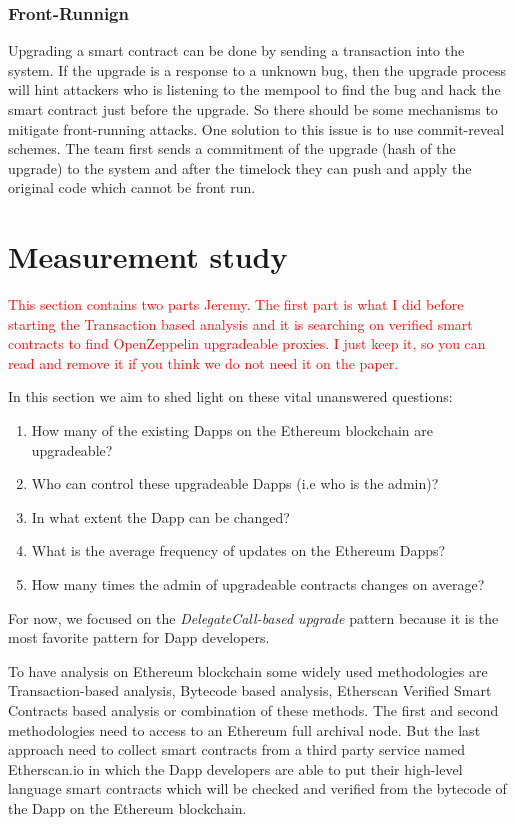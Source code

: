 \subsubsection{Front-Runnign}
Upgrading a smart contract can be done by sending a transaction into the system. If the upgrade is a response to a unknown bug, then the upgrade process will hint attackers who is listening to the mempool to find the bug and hack the smart contract just before the upgrade. So there should be some mechanisms to mitigate front-running attacks. One solution to this issue is to use commit-reveal schemes. The team first sends a commitment of the upgrade (hash of the upgrade) to the system and after the timelock they can push and apply the original code which cannot be front run. 





 \section{Measurement study}
 \textcolor{red}{This section contains two parts Jeremy. The first part is what I did before starting the Transaction based analysis and it is searching on verified smart contracts to find OpenZeppelin upgradeable proxies. I just keep it, so you can read and remove it if you think we do not need it on the paper.}

 In this section we aim to shed light on these vital unanswered questions: 
 \begin{enumerate}
  \item How many of the existing Dapps on the Ethereum blockchain are upgradeable?
  \item Who can control these upgradeable Dapps (i.e who is the admin)? 
  \item In what extent the Dapp can be changed?
  \item What is the average frequency of updates on the Ethereum Dapps?
  \item How many times the admin of upgradeable contracts changes on average?
\end{enumerate}

For now, we focused on the \textit{DelegateCall-based upgrade} pattern because it is the most favorite pattern for Dapp developers.

To have analysis on Ethereum blockchain some widely used methodologies are Transaction-based analysis, Bytecode based analysis, Etherscan Verified Smart Contracts based analysis or combination of these methods. The first and second methodologies need to access to an Ethereum full archival node. But the last approach need to collect smart contracts from a third party service named Etherscan.io in which the Dapp developers are able to put their high-level language smart contracts which will be checked and verified from the bytecode of the Dapp on the Ethereum blockchain.

